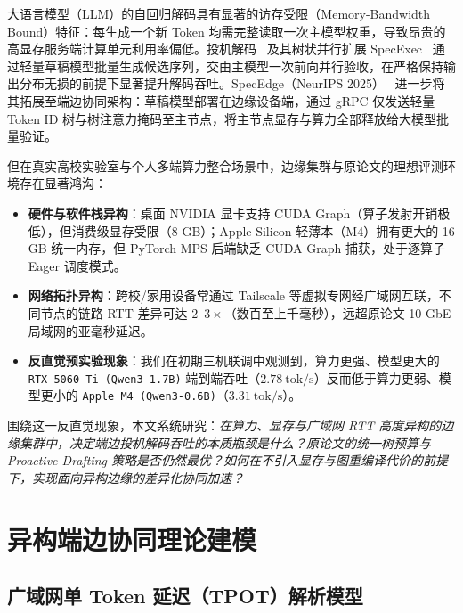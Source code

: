 \documentclass[conference]{IEEEtran}
\begin{document}
大语言模型（LLM）的自回归解码具有显著的访存受限（Memory-Bandwidth Bound）特征：每生成一个新 Token 均需完整读取一次主模型权重，导致昂贵的高显存服务端计算单元利用率偏低。投机解码~\cite{leviathan2023spec} 及其树状并行扩展 SpecExec~\cite{svirschevski2024specexec} 通过轻量草稿模型批量生成候选序列，交由主模型一次前向并行验收，在严格保持输出分布无损的前提下显著提升解码吞吐。SpecEdge（NeurIPS 2025）~\cite{park2025specedge} 进一步将其拓展至端边协同架构：草稿模型部署在边缘设备端，通过 gRPC 仅发送轻量 Token ID 树与树注意力掩码至主节点，将主节点显存与算力全部释放给大模型批量验证。

但在真实高校实验室与个人多端算力整合场景中，边缘集群与原论文的理想评测环境存在显著鸿沟：
\begin{itemize}
  \item \textbf{硬件与软件栈异构}：桌面 NVIDIA 显卡支持 CUDA Graph（算子发射开销极低），但消费级显存受限（8 GB）；Apple Silicon 轻薄本（M4）拥有更大的 16 GB 统一内存，但 PyTorch MPS 后端缺乏 CUDA Graph 捕获，处于逐算子 Eager 调度模式。
  \item \textbf{网络拓扑异构}：跨校/家用设备常通过 Tailscale 等虚拟专网经广域网互联，不同节点的链路 RTT 差异可达 $2\text{--}3\times$（数百至上千毫秒），远超原论文 10 GbE 局域网的亚毫秒延迟。
  \item \textbf{反直觉预实验现象}：我们在初期三机联调中观测到，算力更强、模型更大的 \texttt{RTX 5060 Ti (Qwen3-1.7B)} 端到端吞吐（$2.78\ \text{tok/s}$）反而低于算力更弱、模型更小的 \texttt{Apple M4 (Qwen3-0.6B)}（$3.31\ \text{tok/s}$）。
\end{itemize}

围绕这一反直觉现象，本文系统研究：\emph{在算力、显存与广域网 RTT 高度异构的边缘集群中，决定端边投机解码吞吐的本质瓶颈是什么？原论文的统一树预算与 Proactive Drafting 策略是否仍然最优？如何在不引入显存与图重编译代价的前提下，实现面向异构边缘的差异化协同加速？}

\section{异构端边协同理论建模}

\subsection{广域网单 Token 延迟（TPOT）解析模型}
\end{document}
